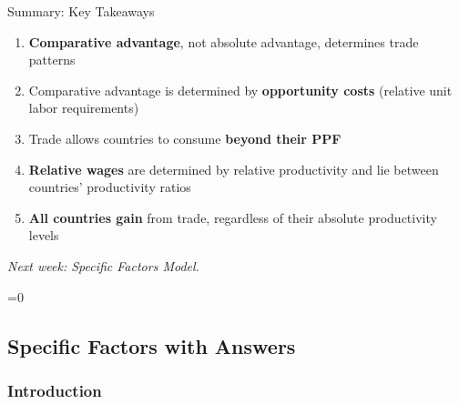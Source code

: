 \documentclass{beamer}
\newcommand{\showanswers}{1}  %
\begin{document}

\begin{frame}{Summary: Key Takeaways}

\begin{enumerate}
    \item \textbf{Comparative advantage}, not absolute advantage, determines trade patterns
    
    \vspace{0.3cm}
    
    \item Comparative advantage is determined by \textbf{opportunity costs} (relative unit labor requirements)
    
    \vspace{0.3cm}
    
    \item Trade allows countries to consume \textbf{beyond their PPF}
    
    \vspace{0.3cm}
    
    \item \textbf{Relative wages} are determined by relative productivity and lie between countries' productivity ratios
    
    \vspace{0.3cm}
    
    \item \textbf{All countries gain} from trade, regardless of their absolute productivity levels
\end{enumerate}

\vspace{0.5cm}

\textit{Next week: Specific Factors Model.}

\end{frame}

\fi

\ifnum\showanswers=0

\subsection{Specific Factors with Answers}

\subsubsection{Introduction}
\end{document}
